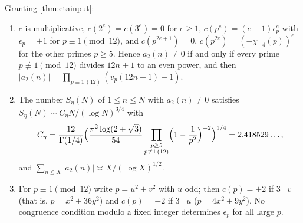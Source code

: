 \documentclass[11pt]{article}
\begin{document}
\begin{theorem}[Square]\label{thm:square}
Granting \cref{thm:etainput}:
\begin{enumerate}[label=\textup{(\alph*)},nosep]
\item $c$ is multiplicative, $c(2^e)=c(3^e)=0$ for $e\ge1$, $c(p^e)=(e+1)\epsilon_p^e$ with
$\epsilon_p=\pm1$ for $p\equiv1\pmod{12}$, and $c(p^{2e+1})=0$, $c(p^{2e})=(-\chi_{-4}(p))^e$
for the other primes $p\ge5$. Hence $a_2(n)\ne0$ if and only if every prime
$p\not\equiv1\pmod{12}$ divides $12n+1$ to an even power, and then
$|a_2(n)|=\prod_{p\equiv1\,(12)}(v_p(12n+1)+1)$.
\item The number $S_\eta(N)$ of $1\le n\le N$ with $a_2(n)\ne0$ satisfies
$S_\eta(N)\sim C_\eta N/(\log N)^{3/4}$ with
\begin{equation}\label{eq:Ceta}
C_\eta=\frac{12}{\Gamma(1/4)}\Bigl(\frac{\pi^2\log(2+\sqrt3)}{54}
\prod_{\substack{p\ge5\\p\not\equiv1\,(12)}}\Bigl(1-\frac1{p^2}\Bigr)^{-2}\Bigr)^{1/4}=2.418529\ldots,
\end{equation}
and $\sum_{n\le X}|a_2(n)|\asymp X/(\log X)^{1/2}$.
\item For $p\equiv1\pmod{12}$ write $p=u^2+v^2$ with $u$ odd; then $c(p)=+2$ if $3\mid v$
(that is, $p=x^2+36y^2$) and $c(p)=-2$ if $3\mid u$ ($p=4x^2+9y^2$). No congruence
condition modulo a fixed integer determines $\epsilon_p$ for all large $p$.
\end{enumerate}
\end{theorem}
\end{document}
